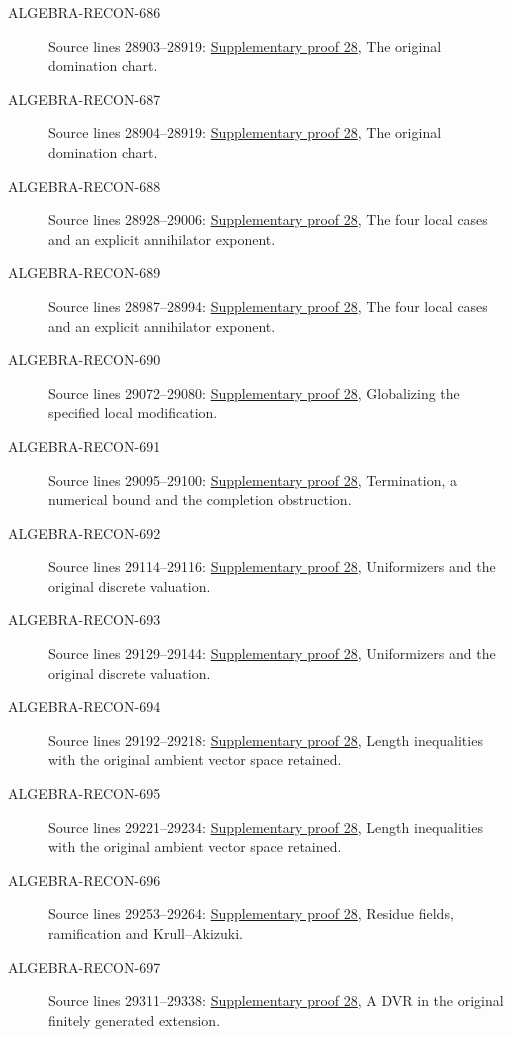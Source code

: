 \begin{description}
\item[ALGEBRA-RECON-686] Source lines 28903--28919: \hyperlink{algebra_krull_akizuki_notes_20260928}{Supplementary proof 28}, The original domination chart.
\item[ALGEBRA-RECON-687] Source lines 28904--28919: \hyperlink{algebra_krull_akizuki_notes_20260928}{Supplementary proof 28}, The original domination chart.
\item[ALGEBRA-RECON-688] Source lines 28928--29006: \hyperlink{algebra_krull_akizuki_notes_20260928}{Supplementary proof 28}, The four local cases and an explicit annihilator exponent.
\item[ALGEBRA-RECON-689] Source lines 28987--28994: \hyperlink{algebra_krull_akizuki_notes_20260928}{Supplementary proof 28}, The four local cases and an explicit annihilator exponent.
\item[ALGEBRA-RECON-690] Source lines 29072--29080: \hyperlink{algebra_krull_akizuki_notes_20260928}{Supplementary proof 28}, Globalizing the specified local modification.
\item[ALGEBRA-RECON-691] Source lines 29095--29100: \hyperlink{algebra_krull_akizuki_notes_20260928}{Supplementary proof 28}, Termination, a numerical bound and the completion obstruction.
\item[ALGEBRA-RECON-692] Source lines 29114--29116: \hyperlink{algebra_krull_akizuki_notes_20260928}{Supplementary proof 28}, Uniformizers and the original discrete valuation.
\item[ALGEBRA-RECON-693] Source lines 29129--29144: \hyperlink{algebra_krull_akizuki_notes_20260928}{Supplementary proof 28}, Uniformizers and the original discrete valuation.
\item[ALGEBRA-RECON-694] Source lines 29192--29218: \hyperlink{algebra_krull_akizuki_notes_20260928}{Supplementary proof 28}, Length inequalities with the original ambient vector space retained.
\item[ALGEBRA-RECON-695] Source lines 29221--29234: \hyperlink{algebra_krull_akizuki_notes_20260928}{Supplementary proof 28}, Length inequalities with the original ambient vector space retained.
\item[ALGEBRA-RECON-696] Source lines 29253--29264: \hyperlink{algebra_krull_akizuki_notes_20260928}{Supplementary proof 28}, Residue fields, ramification and Krull–Akizuki.
\item[ALGEBRA-RECON-697] Source lines 29311--29338: \hyperlink{algebra_krull_akizuki_notes_20260928}{Supplementary proof 28}, A DVR in the original finitely generated extension.

\end{description}
